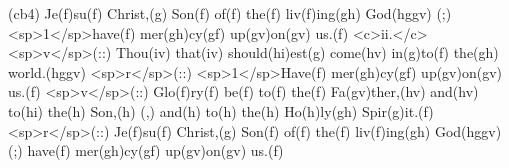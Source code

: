 (cb4) Je(f)su(f) Christ,(g) Son(f) of(f) the(f) liv(f)ing(gh) God(hggv) (;) <sp>1</sp>have(f) mer(gh)cy(gf) up(gv)on(gv) us.(f) <c>ii.</c> <sp>v</sp>(::) Thou(iv) that(iv) should(hi)est(g) come(hv) in(g)to(f) the(gh) world.(hggv) <sp>r</sp>(::) <sp>1</sp>Have(f) mer(gh)cy(gf) up(gv)on(gv) us.(f) <sp>v</sp>(::) Glo(f)ry(f) be(f) to(f) the(f) Fa(gv)ther,(hv) and(hv) to(hi) the(h) Son,(h) (,) and(h) to(h) the(h) Ho(h)ly(gh) Spir(g)it.(f) <sp>r</sp>(::) Je(f)su(f) Christ,(g) Son(f) of(f) the(f) liv(f)ing(gh) God(hggv) (;) have(f) mer(gh)cy(gf) up(gv)on(gv) us.(f)